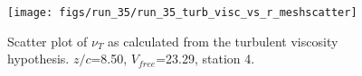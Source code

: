 \begin{figure}[H]
\centering
\texttt{[image: figs/run\_35/run\_35\_turb\_visc\_vs\_r\_meshscatter]}
\caption{Scatter plot of $\nu_T$ as calculated from the turbulent viscosity hypothesis. $z/c$=8.50, $V_{free}$=23.29, station 4.}
\label{fig:run_35_turb_visc_vs_r_meshscatter}
\end{figure}


